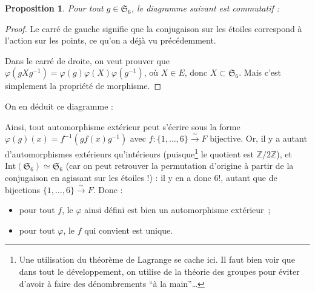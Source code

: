 \documentclass[a4paper, 11pt]{article}
\def\Z{\mathbb{Z}}
\def\Sigmap{\mathfrak{S}}
\newtheorem*{proposition}{Proposition}
\begin{document}
\begin{proposition}
  Pour tout $g \in \Sigmap_6$, le diagramme suivant est commutatif :
  \begin{center}
  \end{center}
\end{proposition}
\begin{proof}
  Le carré de gauche signifie que la conjugaison sur les étoiles correspond à
  l'action sur les points, ce qu'on a déjà vu précédemment.
  
  Dans le carré de droite, on veut prouver que $\varphi(gXg^{-1}) =
  \varphi(g)\varphi(X)\varphi(g^{-1})$, où $X \in E$, donc $X \subset \Sigmap_6$. Mais
  c'est simplement la propriété de morphisme.
\end{proof}
On en déduit ce diagramme :

Ainsi, tout automorphisme extérieur peut s'écrire sous la forme $\varphi(g)(x) =
f^{-1}(gf(x)g^{-1})$ avec $f : \{1, \ldots, 6\} \xrightarrow{\sim} F$ bijective.
Or, il y a autant d'automorphismes extérieurs qu'intérieurs
(puisque\footnote{Une utilisation du théorème de Lagrange se cache ici. Il faut
  bien voir que dans tout le développement, on utilise de la théorie des groupes
  pour éviter d'avoir à faire des dénombrements \enquote{à la main}…} le
quotient est $\Z/2\Z$), et $\mathrm{Int}(\Sigmap_6) \simeq \Sigmap_6$ (car on
peut retrouver la permutation d'origine à partir de la conjugaison en agissant
sur les étoiles !) : il y en a donc $6!$, autant que de bijections $\{1, \ldots,
6\} \xrightarrow{\sim} F$. Donc :
\begin{itemize}
\item pour tout $f$, le $\varphi$ ainsi défini est bien un automorphisme
  extérieur~;
\item pour tout $\varphi$, le $f$ qui convient est unique.
\end{itemize}
\end{document}
